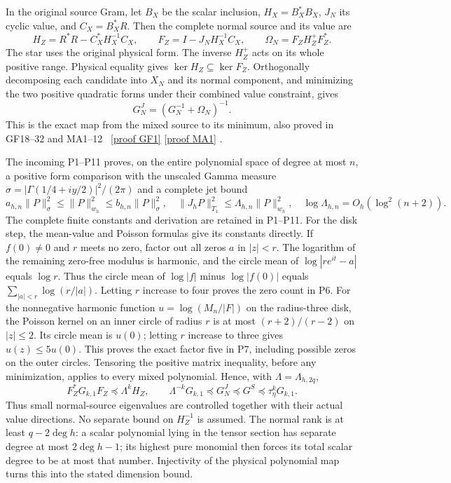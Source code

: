 \documentclass[11pt]{article}
\begin{document}
In the original source Gram, let $B_X$ be the scalar inclusion,
$H_X=B_X^*B_X$, $J_N$ its cyclic value, and $C_X=B_X^*R$.
Then the complete normal source and its value are
\[
 H_Z=R^*R-C_X^*H_X^{-1}C_X,\qquad
 F_Z=I-J_NH_X^{-1}C_X,\qquad
 \Omega_N=F_ZH_Z^+F_Z^*.
 \tag{JM2}
\]
The star uses the original physical form. The inverse $H_Z^+$ acts on
its whole positive range. Physical equality gives
$\ker H_Z\subseteq\ker F_Z$. Orthogonally decomposing each candidate
into $X_N$ and its normal component, and minimizing the two positive
quadratic forms under their combined value constraint, gives
\[
 G_N^J=(G_N^{-1}+\Omega_N)^{-1}.\tag{JM3}
\]
This is the exact map from the mixed source to its minimum, also proved
in GF18--32 and MA1--12 \cite{mrjm:GF,mrjm:MA}%
~\href{https://github.com/KokunoYumeto/zeta-function-research-reader/blob/main/workbenches/splitzero-tandem/continuations/20260921-kernel-degree-steps/providers/OBSERVATION_COMPLETE_PROOFS.tex\#L1108}{[proof GF1]} \href{https://github.com/KokunoYumeto/zeta-function-research-reader/blob/main/workbenches/splitzero-tandem/continuations/20260921-kernel-degree-steps/providers/OBSERVATION_COMPLETE_PROOFS.tex\#L1893}{[proof MA1]}%
{}.

The incoming P1--P11 proves, on the entire polynomial space of degree
at most $n$, a positive form comparison with the unscaled Gamma
measure $\sigma=|\Gamma(1/4+iy/2)|^2/(2\pi)$ and a complete jet bound
\[
 a_{h,n}\|P\|_\sigma^2\le\|P\|_{w_h}^2\le b_{h,n}\|P\|_\sigma^2,
 \quad \|J_hP\|_{T_1}^2\le\Lambda_{h,n}\|P\|_{w_h}^2,
 \quad\log\Lambda_{h,n}=O_h(\log^2(n+2)).\tag{JM4}
\]
The complete finite constants and derivation are retained in P1--P11.
For the disk step, the mean-value and Poisson formulas
\cite{mrjm:Complex} give its constants directly. If $f(0)\ne0$ and
$r$ meets no zero, factor out all zeros $a$ in $|z|<r$.
The logarithm of the remaining zero-free modulus is harmonic, and
the circle mean of $\log|re^{it}-a|$ equals $\log r$.
Thus the circle mean of $\log|f|$ minus $\log|f(0)|$ equals
$\sum_{|a|<r}\log(r/|a|)$. Letting $r$ increase to four proves
the zero count in P6. For the nonnegative harmonic function
$u=\log(M_n/|F|)$ on the radius-three disk, the Poisson kernel on
an inner circle of radius $r$ is at most $(r+2)/(r-2)$ on
$|z|\le2$. Its circle mean is $u(0)$; letting $r$ increase to
three gives $u(z)\le5u(0)$. This proves the exact factor five
in P7, including possible zeros on the outer circles.
Tensoring the positive matrix inequality, before any minimization,
applies to every mixed polynomial. Hence, with $\Lambda=\Lambda_{h,2q}$,
\[
 F_Z^*G_{k,1}F_Z\preceq\Lambda^kH_Z,\qquad
 \Lambda^{-k}G_{k,1}\preceq G_N^J
 \preceq G^S\preceq\tau_\eta^kG_{k,1}.\tag{JM5}
\]
Thus small normal-source eigenvalues are controlled together with
their actual value directions. No separate bound on $H_Z^{-1}$ is
assumed. The normal rank is at least $q-2\deg h$: a scalar polynomial
lying in the tensor section has separate degree at most $2\deg h-1$;
its highest pure monomial then forces its total scalar degree to be
at most that number. Injectivity of the physical polynomial map
turns this into the stated dimension bound.
\end{document}
